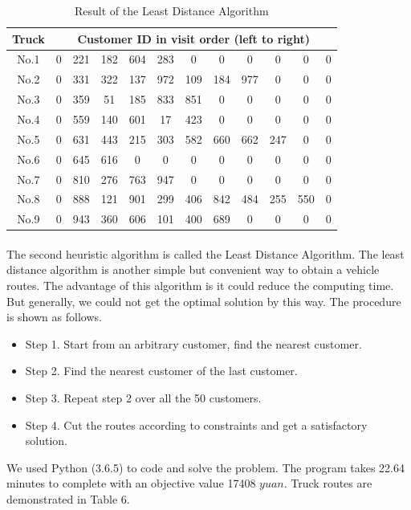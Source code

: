 \documentclass[12pt]{article}
\numberwithin{equation}{section}
\begin{document}
	\begin{table}[htbp]
	\centering
	\caption{Result of the Least Distance Algorithm}
	\begin{tabular}{c|ccccccccccc}
	\hline
	Truck & \multicolumn{11}{c}{Customer ID in visit order (left to right)}\\
	\hline
	No.1 & 0 & 221 & 182 & 604 & 283 & 0 & 0 & 0 & 0 & 0 & 0\\
	No.2 & 0 & 331 & 322 & 137 & 972 & 109 & 184 & 977 & 0 & 0 & 0\\
	No.3 & 0 & 359 & 51 & 185 & 833 & 851 & 0 & 0 & 0 & 0 & 0 \\
	No.4 & 0 & 559 & 140 & 601 & 17 & 423 & 0 & 0 & 0 & 0 & 0\\
	No.5 & 0 & 631 & 443 & 215 & 303 & 582 & 660 & 662 & 247 & 0 & 0 \\
	No.6 & 0 & 645 & 616 & 0 & 0 & 0 & 0 & 0 & 0 & 0 & 0 \\
	No.7 & 0 & 810 & 276 & 763 & 947 & 0 & 0 & 0 & 0 & 0 & 0 \\
	No.8 & 0 & 888 & 121 & 901 & 299 & 406 & 842 & 484 & 255 & 550 & 0 \\
	No.9 & 0 & 943 & 360 & 606 & 101 & 400 & 689 & 0 & 0 & 0 & 0 \\
	\hline
	\end{tabular}
	\end{table}
	
	\paragraph{}The second heuristic algorithm is called the Least Distance Algorithm. The least distance algorithm is another simple but convenient way to obtain a vehicle routes. The advantage of this algorithm is it could reduce the computing time. But generally, we could not get the optimal solution by this way. The procedure is shown as follows.
	\begin{itemize}
	\item[] Step 1. Start from an arbitrary customer, find the nearest customer.
	\item[] Step 2. Find the nearest customer of the last customer.
	\item[] Step 3. Repeat step 2 over all the 50 customers.
	\item[] Step 4. Cut the routes according to constraints and get a satisfactory solution.
	\end{itemize}
We used Python (3.6.5) to code and solve the problem. The program takes 22.64 minutes to complete with an objective value 17408 $yuan$. Truck routes are demonstrated in Table 6.
	
\end{document}
